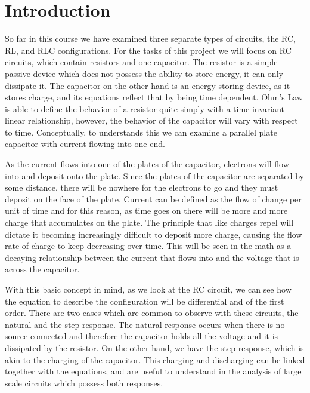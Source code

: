 \documentclass[12pt]{article}
\begin{document}
    \section*{Introduction}
    \par So far in this course we have examined three separate types of
    circuits, the RC, RL, and RLC configurations. For the tasks of this project
    we will focus on RC circuits, which contain resistors and one capacitor.
    The resistor is a simple passive device which does not possess the ability
    to store energy, it can only dissipate it. The capacitor on the other hand
    is an energy storing device, as it stores charge, and its equations reflect
    that by being time dependent. Ohm's Law is able to define the behavior of a
    resistor quite simply with a time invariant linear relationship, however,
    the behavior of the capacitor will vary with respect to time. Conceptually,
    to understands this we can examine a parallel plate capacitor with current
    flowing into one end.
    \par As the current flows into one of the plates of the capacitor, electrons
    will flow into and deposit onto the plate. Since the plates of the capacitor
    are separated by some distance, there will be nowhere for the electrons to
    go and they must deposit on the face of the plate. Current can be defined as
    the flow of change per unit of time and for this reason, as time goes on
    there will be more and more charge that accumulates on the plate. The
    principle that like charges repel will dictate it becoming increasingly
    difficult to deposit more charge, causing the flow rate of charge to keep
    decreasing over time. This will be seen in the math as a decaying
    relationship between the current that flows into and the voltage that is
    across the capacitor.
    \par With this basic concept in mind, as we look at the RC circuit, we can
    see how the equation to describe the configuration will be differential and
    of the first order. There are two cases which are common to observe with
    these circuits, the natural and the step response. The natural response
    occurs when there is no source connected and therefore the capacitor holds
    all the voltage and it is dissipated by the resistor. On the other hand, we
    have the step response, which is akin to the charging of the capacitor. This
    charging and discharging can be linked together with the equations, and are
    useful to understand in the analysis of large scale circuits which possess
    both responses.
\end{document}
